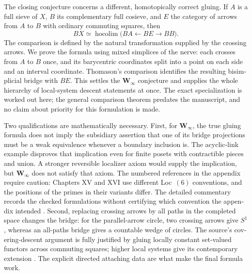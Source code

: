 \begin{otherlanguage}{english}
The closing conjecture concerns a different, homotopically correct gluing. If \(A\) is a full sieve of \(X\), \(B\) its complementary full cosieve, and \(E\) the category of arrows from \(A\) to \(B\) with ordinary commuting squares, then
\[
 BX\simeq\operatorname{hocolim}\bigl(BA\longleftarrow BE\longrightarrow BB\bigr).
\]
The comparison is defined by the natural transformation supplied by the crossing arrows. We prove the formula using mixed simplices of the nerve: each crosses from \(A\) to \(B\) once, and its barycentric coordinates split into a point on each side and an interval coordinate. Thomason's comparison identifies the resulting bisimplicial bridge with \(BE\). This settles the \(\mathbf W_\infty\) conjecture and supplies the whole hierarchy of local-system descent statements at once. The exact specialization is worked out here; the general comparison theorem predates the manuscript, and no claim about priority for this formulation is made.

Two qualifications are mathematically necessary. First, for \(\mathbf W_\infty\), the true gluing formula does not imply the subsidiary assertion that one of its bridge projections must be a weak equivalence whenever a boundary inclusion is. The acyclic-link example disproves that implication even for finite posets with contractible pieces and union. A stronger reversible localizer axiom would supply the implication, but \(\mathbf W_\infty\) does not satisfy that axiom. The numbered references in the appendix require caution: Chapters XV and XVI use different Loc~\((6)\) conventions, and the positions of the primes in their variants differ. The detailed commentary records the checked formulations without certifying which convention the appendix intended \citep{Grothendieck1990XV,GrothendieckDerivateursXVI}. Second, replacing crossing arrows by all paths in the completed space changes the bridge: for the parallel-arrow circle, two crossing arrows give \(S^1\), whereas an all-paths bridge gives a countable wedge of circles. The source's covering-descent argument is fully justified by gluing locally constant set-valued functors across commuting squares; higher local systems give its contemporary extension \citep{Lurie2009HTT}. The explicit directed attaching data are what make the final formula work.
\end{otherlanguage}
\dgrchunkend

